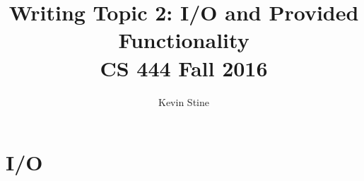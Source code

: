 \documentclass[letterpaper,10pt,draftclsnofoot,onecolumn,titlepage]{IEEEtran}
\def\name{Kevin Stine}
\begin{document}
	\title{\huge Writing Topic 2: I/O and Provided Functionality\\CS 444 Fall 2016}
	\author{\large \name}
	\maketitle
	\newpage
	\section*{I/O}

	\clearpage

	\begin{thebibliography}{3}



	\end{thebibliography}
\end{document}
